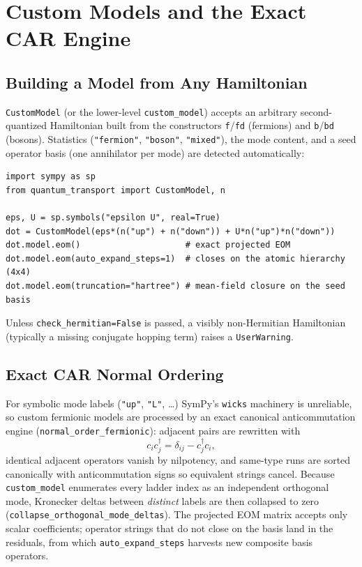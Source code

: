 \documentclass[11pt,a4paper]{article}
\begin{document}
\section{Custom Models and the Exact CAR Engine}
\subsection{Building a Model from Any Hamiltonian}
\texttt{CustomModel} (or the lower-level \texttt{custom\_model}) accepts an arbitrary
second-quantized Hamiltonian built from the constructors \texttt{f}/\texttt{fd}
(fermions) and \texttt{b}/\texttt{bd} (bosons). Statistics
(\texttt{"fermion"}, \texttt{"boson"}, \texttt{"mixed"}), the mode content, and a seed
operator basis (one annihilator per mode) are detected automatically:
\begin{lstlisting}[style=py]
import sympy as sp
from quantum_transport import CustomModel, n

eps, U = sp.symbols("epsilon U", real=True)
dot = CustomModel(eps*(n("up") + n("down")) + U*n("up")*n("down"))
dot.model.eom()                     # exact projected EOM
dot.model.eom(auto_expand_steps=1)  # closes on the atomic hierarchy (4x4)
dot.model.eom(truncation="hartree") # mean-field closure on the seed basis
\end{lstlisting}
Unless \texttt{check\_hermitian=False} is passed, a visibly non-Hermitian
Hamiltonian (typically a missing conjugate hopping term) raises a
\texttt{UserWarning}.

\subsection{Exact CAR Normal Ordering}
For symbolic mode labels (\texttt{"up"}, \texttt{"L"}, \dots) SymPy's
\texttt{wicks} machinery is unreliable, so custom fermionic models are processed by
an exact canonical anticommutation engine (\texttt{normal\_order\_fermionic}):
adjacent pairs are rewritten with
\begin{equation}
  c_i c_j^\dagger = \delta_{ij} - c_j^\dagger c_i ,
\end{equation}
identical adjacent operators vanish by nilpotency, and same-type runs are sorted
canonically with anticommutation signs so equivalent strings cancel. Because
\texttt{custom\_model} enumerates every ladder index as an independent orthogonal
mode, Kronecker deltas between \emph{distinct} labels are then collapsed to zero
(\texttt{collapse\_orthogonal\_mode\_deltas}). The projected EOM matrix accepts only
scalar coefficients; operator strings that do not close on the basis land in the
residuals, from which \texttt{auto\_expand\_steps} harvests new composite basis
operators.
\end{document}
